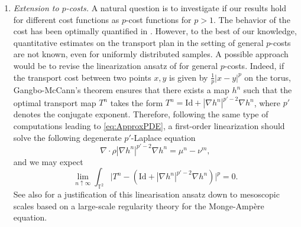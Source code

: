 \documentclass[11pt,a4paper,oneside]{amsart}
\numberwithin{equation}{section}
\begin{document}
\begin{enumerate}
\item \emph{Extension to $p$-costs. }A natural question is to investigate if our results hold for different cost functions as $p$-cost functions for $p>1$. The behavior of the cost has been optimally quantified in \cite{AKT84,boutet2002almost,Barthe2013,Fournier2015}. However, to the best of our knowledge, quantitative estimates on the transport plan in the setting of general $p$-costs are not known, even for uniformly distributed samples.
A possible approach would be to revise the linearization ansatz of \cite{caracciolo2014scaling} for general $p$-costs. Indeed, if the transport cost between two points $x,y$ is given by $\frac{1}{p}|x-y|^p$ on the torus, Gangbo-McCann's theorem \cite[Theorem 1.2]{Gangbo1996} ensures that there exists a map $h^n$ such that the optimal transport map $T^n$ takes the form $T^n= \text{Id} +  |\nabla h^n|^{p'-2}\nabla h^n$, where $p'$ denotes the conjugate exponent. Therefore, following the same type of computations leading to \eqref{eq:ApproxPDE}, a first-order linearization should solve the following degenerate $p'$-Laplace equation
%
$$\nabla \cdot \rho|\nabla h^n|^{p'-2}\nabla h^n=\mu^n- \nu^m,$$
%
and we may expect 
%
$$\lim_{n\uparrow\infty}\int_{\mathbb{T}^2}\vert T^n-(\text{Id}+|\nabla h^n|^{p'-2}\nabla h^n)\vert^{p}=0.$$
%
%
See also \cite{Lukas} for a justification of this linearisation ansatz down to mesoscopic scales based on a large-scale regularity theory for the Monge-Amp\`ere equation.


\medskip


\end{enumerate}
\end{document}
